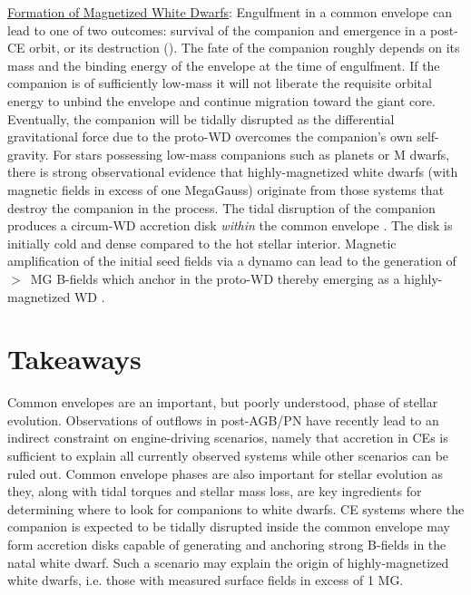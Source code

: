 \documentclass{iau_FM}
\begin{document}
{\sc\underline{Formation of Magnetized White Dwarfs}}: Engulfment in a common envelope can lead to one of two outcomes: survival of the companion and emergence in a post-CE orbit, or its destruction (\cite{2006MNRAS.370.2004N}).  The fate of the companion roughly depends on its mass and the binding energy of the envelope at the time of engulfment.  If the companion is of sufficiently low-mass it will not liberate the requisite orbital energy to unbind the envelope and continue migration toward the giant core.  Eventually, the companion will be tidally disrupted as the differential gravitational force due to the proto-WD overcomes the companion's own self-gravity.  For stars possessing low-mass companions such as planets or M dwarfs, there is strong observational evidence that highly-magnetized white dwarfs (with magnetic fields in excess of one MegaGauss) originate from those systems that destroy the companion in the process.  The tidal disruption of the companion produces a circum-WD accretion disk {\it within} the common envelope \cite{2011PNAS..108.3135N}.  The disk is initially cold and dense compared to the hot stellar interior.  Magnetic amplification of the initial seed fields via a dynamo can lead to the generation of $>$~MG B-fields which anchor in the proto-WD thereby emerging as a highly-magnetized WD \cite{2011PNAS..108.3135N}.

\section{Takeaways}
Common envelopes are an important, but poorly understood, phase of stellar evolution.  Observations of outflows in post-AGB/PN have recently lead to an indirect constraint on engine-driving scenarios, namely that accretion in CEs is sufficient to explain all currently observed systems while other scenarios can be ruled out.  Common envelope phases are also important for stellar evolution as they, along with tidal torques and stellar mass loss, are key ingredients for determining where to look for companions to white dwarfs.  CE systems where the companion is expected to be tidally disrupted inside the common envelope may form accretion disks capable of generating and anchoring strong B-fields in the natal white dwarf.  Such a scenario may explain the origin of highly-magnetized white dwarfs, i.e. those with measured surface fields in excess of 1 MG.  
\end{document}
